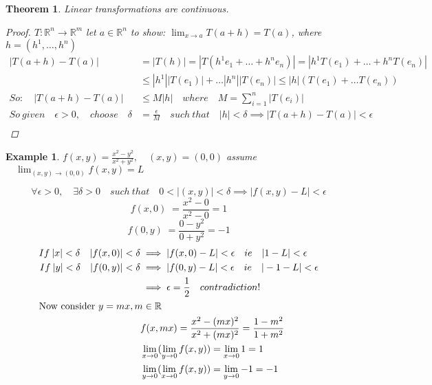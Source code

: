 \documentclass[12pt]{article}
\def\RR{\mathbb{R}}
\newtheorem{theorem}{Theorem}[section]
\newtheorem{example}{Example}[section]
\begin{document}
\begin{theorem}\label{T:Lin trans cont}
Linear transformations are continuous.
\begin{proof}
$T:\RR^{n} \rightarrow \RR^{m}$ let $a \in \RR^{n}$ to show: $\lim_{x\to a}T(a+h) = T(a)$, where $h = (h^1 , \dots , h^n )$
\begin{align*}
|T(a+h) - T(a)| & = |T(h)|=|T(h^{1}e_{1}+ \dots +h^{n}e_{n})| =|h^{1}T(e_{1}) + \dots +h^{n}T(e_{n})|\\ 
&\leq  |h^{1}||T(e_{1})|+ \dots |h^{n}||T(e_{n})| \leq |h|(T(e_{1})+ \dots T(e_{n})) \\
So: \quad |T(a+h) - T(a)| &\leq  M|h| \quad where \quad M= \sum_{i=1}^{n}|T(e_i)| \\
So \: given \quad \epsilon > 0,\quad choose \quad \delta &= \frac{\epsilon}{M} \quad such \: that \quad |h|< \delta \implies |T(a+h) - T(a)|< \epsilon \\
\end{align*}
\end{proof}
\end{theorem}

\begin{example}
$f(x,y)= \frac{x^{2} - y^{2}}{x^{2} +y^{2}}, \quad (x,y)=(0,0)$ assume $\quad \lim_{(x,y) \to (0,0)} f(x,y) = L$

\[\forall \epsilon > 0, \quad  \exists \delta >0  \quad such\: that \quad 0<|(x,y)|<\delta \implies |f(x,y)-L|<\epsilon \]
\[f(x,0) \;= \frac{x^{2}-0}{x^{2}-0} = 1\]
\[ f(0,y)\;= \frac{0-y^{2}}{0 +y^{2}} = -1\]
\begin{align*}
If \: |x|< \delta \quad |f(x,0)| < \delta & \implies |f(x,0) - L|< \epsilon \quad ie \quad |1-L|< \epsilon\\
If \: |y|< \delta \quad |f(0,y)| < \delta& \implies |f(0,y) - L|< \epsilon \quad ie \quad |-1-L|< \epsilon\\
&\implies \epsilon = \frac{1}{2} \quad contradiction! \\
\shortintertext{Now consider $ y=mx, m \in \RR$}
&f(x,mx)=\frac{x^{2} - (mx)^{2}}{x^{2} + (mx)^{2}} = \frac{1-m^{2}}{1+m^{2}}\\
&\lim_{x \to 0}(\lim_{y \to 0} f(x,y)) = \lim_{x \to 0}1 = 1\\
&\lim_{y \to 0}(\lim_{x \to 0} f(x,y)) = \lim_{y \to 0}-1 = -1\\
\end{align*}
\\

\end{example}
\end{document}
